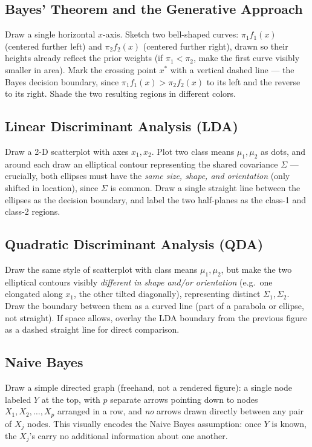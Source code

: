 \documentclass[11pt]{article}
\begin{document}
\subsection{Bayes' Theorem and the Generative Approach}
\begin{instructornote}
Draw a single horizontal $x$-axis. Sketch two bell-shaped curves: $\pi_1 f_1(x)$ (centered further left) and $\pi_2 f_2(x)$ (centered further right), drawn so their heights already reflect the prior weights (if $\pi_1<\pi_2$, make the first curve visibly smaller in area). Mark the crossing point $x^*$ with a vertical dashed line --- the Bayes decision boundary, since $\pi_1f_1(x) > \pi_2f_2(x)$ to its left and the reverse to its right. Shade the two resulting regions in different colors.
\end{instructornote}

\subsection{Linear Discriminant Analysis (LDA)}
\label{sec:visual-lda}
\begin{instructornote}
Draw a 2-D scatterplot with axes $x_1,x_2$. Plot two class means $\mu_1,\mu_2$ as dots, and around each draw an elliptical contour representing the shared covariance $\Sigma$ --- crucially, both ellipses must have the \emph{same size, shape, and orientation} (only shifted in location), since $\Sigma$ is common. Draw a single straight line between the ellipses as the decision boundary, and label the two half-planes as the class-1 and class-2 regions.
\end{instructornote}

\subsection{Quadratic Discriminant Analysis (QDA)}
\begin{instructornote}
Draw the same style of scatterplot with class means $\mu_1,\mu_2$, but make the two elliptical contours visibly \emph{different in shape and/or orientation} (e.g.\ one elongated along $x_1$, the other tilted diagonally), representing distinct $\Sigma_1,\Sigma_2$. Draw the boundary between them as a curved line (part of a parabola or ellipse, not straight). If space allows, overlay the LDA boundary from the previous figure as a dashed straight line for direct comparison.
\end{instructornote}

\subsection{Naive Bayes}
\label{sec:visual-nb}
\begin{instructornote}
Draw a simple directed graph (freehand, not a rendered figure): a single node labeled $Y$ at the top, with $p$ separate arrows pointing down to nodes $X_1,X_2,\dots,X_p$ arranged in a row, and \emph{no} arrows drawn directly between any pair of $X_j$ nodes. This visually encodes the Naive Bayes assumption: once $Y$ is known, the $X_j$'s carry no additional information about one another.
\end{instructornote}
\end{document}
